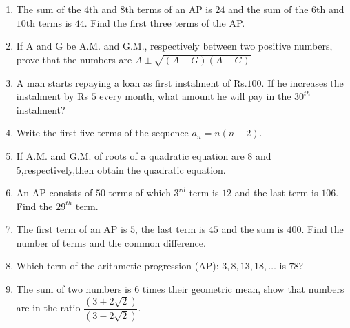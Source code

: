 \begin{enumerate}[label=\thesection.\arabic*,ref=\thesection.\theenumi]
\item
The sum of the $4$th and $8$th terms of an AP is $24$ and the sum of the $6$th and $10$th terms is $44$. Find the first three terms of the AP.\\
\solution

\newpage

\item
If A and G be A.M. and G.M., respectively between two positive numbers, prove that the numbers are $A \pm \sqrt{(A+G)(A-G)}$\\
\solution

\newpage

 \item
A man starts repaying a loan as first instalment of Rs.$100$. If he increases the
instalment by Rs $5$ every month, what amount he will pay in the $30^{th}$ instalment? \\
\solution

\newpage

\item 
Write the first five terms of the sequence $a_n = n(n+2)$. \\
\solution

\newpage
\item If A.M. and G.M. of roots of a quadratic equation are 8 and 5,respectively,then obtain the quadratic equation.
\solution

\pagebreak

\item An AP consists of $50$ terms of which $3^{rd}$ term is $12$ and the last term is $106$. Find the $29^{th}$ term.\\
\solution 

\pagebreak

\item The first term of an AP is $5$, the last term is $45$ and the sum is $400$. Find the number of terms and the common difference.\\
\solution

\pagebreak

\item Which term of the arithmetic progression (AP): \(3, 8, 13, 18, \ldots\) is \(78\)?\\
\solution

\pagebreak

\item The sum of two numbers is $6$ times their geometric mean, show that numbers are in the ratio $\dfrac{(3+2\sqrt{2})}{(3-2\sqrt{2})}$. 
\solution

\pagebreak


\end{enumerate}
